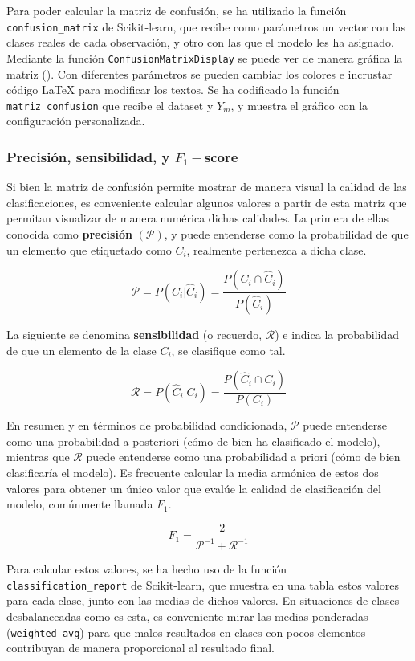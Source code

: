 				Para poder calcular la matriz de confusión, se ha utilizado la función \texttt{confusion\_matrix} de Scikit-learn, que recibe como parámetros un vector con las clases reales de cada observación, y otro con las que el modelo les ha asignado. Mediante la función \texttt{ConfusionMatrixDisplay} se puede ver de manera gráfica la matriz (). Con diferentes parámetros se pueden cambiar los colores e incrustar código \LaTeX{} para modificar los textos. Se ha codificado la función \texttt{matriz\_confusion} que recibe el dataset y $Y_m$, y muestra el gráfico con la configuración personalizada. 
				
			\subsubsection{Precisión, sensibilidad, y $F_1-$score}
				
				Si bien la matriz de confusión permite mostrar de manera visual la calidad de las clasificaciones, es conveniente calcular algunos valores \cite{metricas_matriz} a partir de esta matriz que permitan visualizar de manera numérica dichas calidades. La primera de ellas conocida como \textbf{precisión} $(\mathcal{P})$, y puede entenderse como la probabilidad de que un elemento que etiquetado como $C_i$, realmente pertenezca a dicha clase. 
				
				$$
				\mathcal{P} = P(C_i | \hat{C}_i) = \frac{P(C_i \cap \hat{C}_i)}{P(\hat{C}_i)}
				$$
				
				La siguiente se denomina \textbf{sensibilidad} (o recuerdo, $\mathcal{R}$) e indica la probabilidad de que un elemento de la clase $C_i$, se clasifique como tal. 
				
				$$
				\mathcal{R} = P(\hat{C}_i | C_i) = \frac{P(\hat{C}_i \cap C_i)}{P(C_i)}
				$$
				
				En resumen y en términos de probabilidad condicionada, $\mathcal{P}$ puede entenderse como una probabilidad a posteriori (cómo de bien ha clasificado el modelo), mientras que $\mathcal{R}$ puede entenderse como una probabilidad a priori (cómo de bien clasificaría el modelo). Es frecuente calcular la media armónica de estos dos valores para obtener un único valor que evalúe la calidad de clasificación del modelo, comúnmente llamada $F_1$. 
				
				$$
				F_1 = \frac{2}{\mathcal{P}^{-1} + \mathcal{R}^{-1}}
				$$
				
				Para calcular estos valores, se ha hecho uso de la función \texttt{classification\_report} de Scikit-learn, que muestra en una tabla estos valores para cada clase, junto con las medias de dichos valores. En situaciones de clases desbalanceadas como es esta, es conveniente mirar las medias ponderadas (\texttt{weighted avg}) para que malos resultados en clases con pocos elementos contribuyan de manera proporcional al resultado final. 
				
